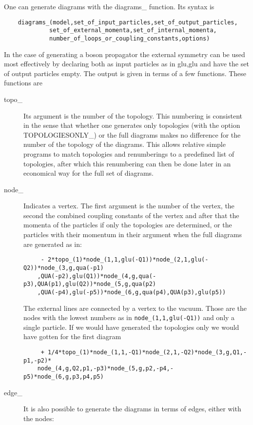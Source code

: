 One can generate diagrams with the diagrams\_ function. Its syntax is
\begin{verbatim}
    diagrams_(model,set_of_input_particles,set_of_output_particles,
             set_of_external_momenta,set_of_internal_momenta,
             number_of_loops_or_coupling_constants,options) 
\end{verbatim}
In the case of generating a boson propagator the external symmetry can be 
used  most effectively by declaring both as input particles as in {glu,glu} 
and have the set of output particles empty. The output is given in terms of 
a few functions. These functions are
\begin{description}
\item[topo\_] Its argument is the number of the topology. This numbering is 
consistent in the sense that whether one generates only topologies (with 
the option TOPOLOGIESONLY\_) or the full diagrams makes no difference for 
the number of the topology of the diagrams. This allows relative 
simple programs to match topologies and renumberings to a predefined list 
of topologies, after which this renumbering can then be done later in an 
economical way for the full set of diagrams.
\item[node\_] Indicates a vertex. The first argument is the number of the 
vertex, the second the combined coupling constants of the vertex and after 
that the momenta of the particles if only the topologies are determined, or 
the  particles with their momentum in their argument when the full diagrams 
are generated as in:
\begin{verbatim}
     - 2*topo_(1)*node_(1,1,glu(-Q1))*node_(2,1,glu(-Q2))*node_(3,g,qua(-p1)
    ,QUA(-p2),glu(Q1))*node_(4,g,qua(-p3),QUA(p1),glu(Q2))*node_(5,g,qua(p2)
    ,QUA(-p4),glu(-p5))*node_(6,g,qua(p4),QUA(p3),glu(p5))
\end{verbatim}
The external lines are connected by a vertex to the vacuum. Those are the 
nodes with the lowest numbers as in \verb:node_(1,1,glu(-Q1)): and only a 
single particle. If we would have generated the topologies only we would 
have gotten for the first diagram
\begin{verbatim}
     + 1/4*topo_(1)*node_(1,1,-Q1)*node_(2,1,-Q2)*node_(3,g,Q1,-p1,-p2)*
    node_(4,g,Q2,p1,-p3)*node_(5,g,p2,-p4,-p5)*node_(6,g,p3,p4,p5)
\end{verbatim}
\item[edge\_] It is also possible to generate the diagrams in terms of 
edges, either with the nodes:
\begin{verbatim}

\end{verbatim}
\end{description}
